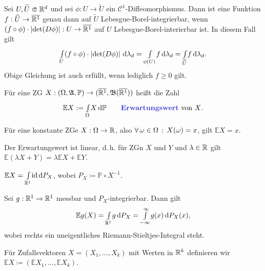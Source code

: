 \documentclass{cheat-sheet}
\newcommand{\Alg}{\mathfrak{A}} %
\renewcommand{\P}{\mathbb{P}} %
\newcommand{\E}{\mathbb{E}} %
\newcommand{\Bor}{\mathfrak{B}} %
\renewcommand{\ER}{\overline{\R^1}} %
\begin{document}

\begin{satz}[Transformationssatz]
  Sei $U, \widetilde{U} \opn \R^d$ und sei $\phi : U \to \widetilde{U}$ ein $\mathcal{C}^1$-Diffeomorphismus. Dann ist eine Funktion $f : \widetilde{U} \to \ER$ genau dann auf $\widetilde{U}$ Lebesgue-Borel-integrierbar, wenn $(f \circ \phi) \cdot \left|\det(D\phi)\right| : U \to \ER$ auf $U$ Lebesgue-Borel-interierbar ist. In diesem Fall gilt
  \[ {\textstyle \int\limits_{U}^{}} (f \circ \phi) \cdot \left|\det(D\phi)\right| \,\mathrm{d} \lambda_d = {\textstyle \int\limits_{\phi(U)}^{}} f \,\mathrm{d} \lambda_d = {\textstyle \int\limits_{\widetilde{U}}^{}} f \,\mathrm{d} \lambda_d. \]
  Obige Gleichung ist auch erfüllt, wenn lediglich $f \geq 0$ gilt.
\end{satz}

\begin{defn}
  Für eine ZG $X : (\Omega, \Alg, \P) \to (\ER, \Bor(\ER))$ heißt die Zahl
  \[ \E X := \Int{\Omega}{}{X}{\P} \qquad \text{\emph{Erwartungswert} von $X$.} \]
\end{defn}


\begin{bem}
  Für eine konstante ZGe $X : \Omega \to \mathbb{R}$, also $\forall \, {\omega \in \Omega} \,:\, X(\omega) = x$, gilt $\E X = x$.
\end{bem}

\begin{satz}
  Der Erwartungswert ist linear, d.\,h. für ZGn $X$ und $Y$ und $\lambda \in \mathbb{R}$ gilt $\E (\lambda X + Y) = \lambda \E X + \E Y$.
\end{satz}

\begin{satz}
  $\E X = \Int{\R^1}{}{\id}{P_X}$, wobei $P_X \coloneqq \P \circ X^{-1}$.
\end{satz}

\begin{kor}
  Sei $g : \mathbb{R}^1 \to \mathbb{R}^1$ messbar und $P_X$-integrierbar. Dann gilt
  \[ \E g(X) = \Int{\R^1}{}{g}{P_X} = \Int{-\infty}{\infty}{g(x)}{P_X(x)}, \]
  wobei rechts ein uneigentliches Riemann-Stieltjes-Integral steht.
\end{kor}

\begin{defn}
  Für Zufallsvektoren $X = (X_1, ..., X_k)$ mit Werten in $\mathbb{R}^k$ definieren wir $\E X \coloneqq (\E X_1, ..., \E X_k)$.
\end{defn}
\end{document}
